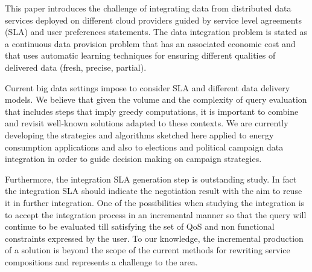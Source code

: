This paper introduces the challenge of integrating data from distributed data services deployed on different cloud providers guided by service level agreements (SLA) and user preferences statements. The data integration problem is stated as a continuous data provision problem that has an associated economic cost and that uses automatic learning techniques for ensuring different qualities of delivered data (fresh, precise, partial).

Current big data settings impose  to consider SLA and different data delivery models. We believe that given the volume and the complexity of query evaluation that includes steps that imply greedy computations, it is important to combine and revisit well-known solutions  adapted to these contexts. We are currently developing the strategies and algorithms sketched here applied to energy consumption applications and also to elections and political campaign data integration in order to guide decision making on campaign strategies.

Furthermore, the integration SLA generation step is outstanding study. In fact the integration SLA should indicate the negotiation result with the aim to reuse it in further integration. One of the possibilities when studying the integration is to accept the integration process in an incremental  manner so that the query will continue to be evaluated till satisfying the set of QoS and non functional constraints expressed by the user. To our knowledge, the incremental production of a solution is beyond  the scope of the current methods for rewriting service compositions and represents a challenge to the area.


% 
%
%
%

